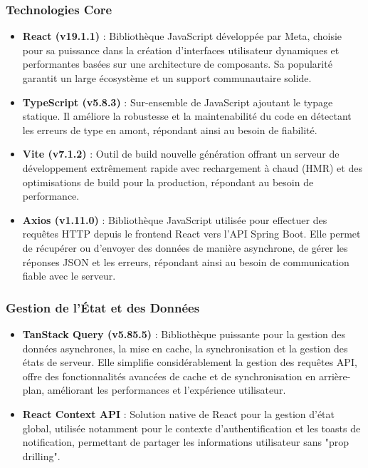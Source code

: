 \subsubsection{Technologies Core}

\begin{itemize}
    \item \textbf{React (v19.1.1)} : Bibliothèque JavaScript développée par Meta, choisie pour sa puissance dans la création d'interfaces utilisateur dynamiques et performantes basées sur une architecture de composants. Sa popularité garantit un large écosystème et un support communautaire solide.

    \item \textbf{TypeScript (v5.8.3)} : Sur-ensemble de JavaScript ajoutant le typage statique. Il améliore la robustesse et la maintenabilité du code en détectant les erreurs de type en amont, répondant ainsi au besoin de fiabilité.

    \item \textbf{Vite (v7.1.2)} : Outil de build nouvelle génération offrant un serveur de développement extrêmement rapide avec rechargement à chaud (HMR) et des optimisations de build pour la production, répondant au besoin de performance.

    \item \textbf{Axios (v1.11.0)} : Bibliothèque JavaScript utilisée pour effectuer des requêtes HTTP depuis le frontend React vers l'API Spring Boot. Elle permet de récupérer ou d'envoyer des données de manière asynchrone, de gérer les réponses JSON et les erreurs, répondant ainsi au besoin de communication fiable avec le serveur.
\end{itemize}

\subsubsection{Gestion de l'État et des Données}

\begin{itemize}
    \item \textbf{TanStack Query (v5.85.5)} : Bibliothèque puissante pour la gestion des données asynchrones, la mise en cache, la synchronisation et la gestion des états de serveur. Elle simplifie considérablement la gestion des requêtes API, offre des fonctionnalités avancées de cache et de synchronisation en arrière-plan, améliorant les performances et l'expérience utilisateur.

    \item \textbf{React Context API} : Solution native de React pour la gestion d'état global, utilisée notamment pour le contexte d'authentification et les toasts de notification, permettant de partager les informations utilisateur sans "prop drilling".
\end{itemize}

